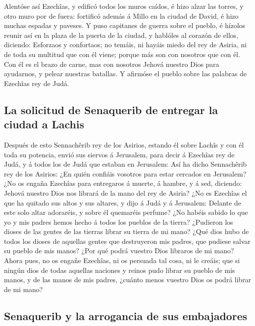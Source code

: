  Alentóse así Ezechîas, y edificó todos los muros caídos, é
hizo alzar las torres, y otro muro por de fuera: fortificó además á
Millo en la ciudad de David, é hizo muchas espadas y paveses.
 Y puso capitanes de guerra sobre el pueblo, é hízolos
reunir así en la plaza de la puerta de la ciudad, y hablóles al corazón
de ellos, diciendo:  Esforzaos y confortaos; no temáis, ni
hayáis miedo del rey de Asiria, ni de toda su multitud que con él viene;
porque más son con nosotros que con él.  Con él es el brazo
de carne, mas con nosotros Jehová nuestro Dios para ayudarnos, y pelear
nuestras batallas. Y afirmóse el pueblo sobre las palabras de Ezechîas
rey de Judá.

\hypertarget{la-solicitud-de-senaquerib-de-entregar-la-ciudad-a-lachis}{%
\subsection{La solicitud de Senaquerib de entregar la ciudad a
Lachis}\label{la-solicitud-de-senaquerib-de-entregar-la-ciudad-a-lachis}}

 Después de esto Sennachêrib rey de los Asirios, estando él
sobre Lachîs y con él toda su potencia, envió sus siervos á Jerusalem,
para decir á Ezechîas rey de Judá, y á todos los de Judá que estaban en
Jerusalem:  Así ha dicho Sennachêrib rey de los Asirios:
¿En quién confiáis vosotros para estar cercados en Jerusalem?
 ¿No os engaña Ezechîas para entregaros á muerte, á hambre,
y á sed, diciendo: Jehová nuestro Dios nos librará de la mano del rey de
Asiria?  ¿No es Ezechîas el que ha quitado sus altos y sus
altares, y dijo á Judá y á Jerusalem: Delante de este solo altar
adoraréis, y sobre él quemaréis perfume?  ¿No habéis sabido
lo que yo y mis padres hemos hecho á todos los pueblos de la tierra?
¿Pudieron los dioses de las gentes de las tierras librar su tierra de mi
mano?  ¿Qué dios hubo de todos los dioses de aquellas
gentes que destruyeron mis padres, que pudiese salvar su pueblo de mis
manos? ¿Por qué podrá vuestro Dios libraros de mi mano? 
Ahora pues, no os engañe Ezechîas, ni os persuada tal cosa, ni le
creáis; que si ningún dios de todas aquellas naciones y reinos pudo
librar su pueblo de mis manos, y de las manos de mis padres, ¿cuánto
menos vuestro Dios os podrá librar de mi mano?

\hypertarget{senaquerib-y-la-arrogancia-de-sus-embajadores}{%
\subsection{Senaquerib y la arrogancia de sus
embajadores}\label{senaquerib-y-la-arrogancia-de-sus-embajadores}}

